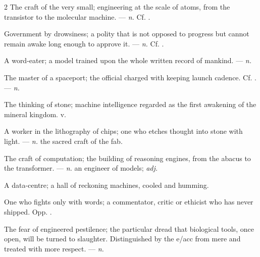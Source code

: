 \begin{multicols}{2}
 The craft of the very small; engineering at the scale of atoms, from the transistor to the molecular machine. —  \textit{n.} Cf. .

 Government by drowsiness; a polity that is not opposed to progress but cannot remain awake long enough to approve it. —  \textit{n.} Cf. .

 A word-eater; a model trained upon the whole written record of mankind.   —  \textit{n.}

 The master of a spaceport; the official charged with keeping launch cadence. Cf. . —  \textit{n.}

 The thinking of stone; machine intelligence regarded as the first awakening of the mineral kingdom.   v.

 A worker in the lithography of chips; one who etches thought into stone with light. —  \textit{n.} the sacred craft of the fab.

 The craft of computation; the building of reasoning engines, from the abacus to the transformer. —  \textit{n.} an engineer of models;  \textit{adj.}

 A data-centre; a hall of reckoning machines, cooled and humming.  

 One who fights only with words; a commentator, critic or ethicist who has never shipped.  Opp. .

 The fear of engineered pestilence; the particular dread that biological tools, once open, will be turned to slaughter. Distinguished by the e/acc from mere  and treated with more respect. —  \textit{n.}


\end{multicols}
